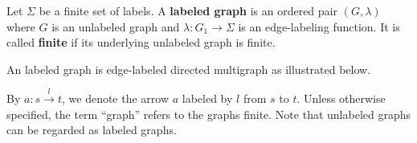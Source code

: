 \documentclass{book}
\begin{document}
    \begin{definition}
        \label{def:graph}
        Let \(\Sigma\) be a finite set of labels. A \textbf{labeled graph} is an ordered pair \((G,\lambda)\) where \( G \) is an unlabeled graph and \( \lambda : G_1 \mathop{\rightarrow} \Sigma\) is an edge-labeling function. 
        It is called \textbf{finite} if its underlying unlabeled graph is finite.  
    \end{definition}
    \begin{example} An labeled graph is edge-labeled directed multigraph as illustrated below.
       
        \begin{center}
      \end{center} 
    \end{example}
    By $a : s\overset{l}{\rightarrow} t$, we denote the arrow $a$ labeled by $l$ from $s$ to $t$. Unless otherwise specified, the term \enquote{graph} refers to the graphs finite. Note that unlabeled graphs can be regarded as labeled graphs. 
\end{document}
